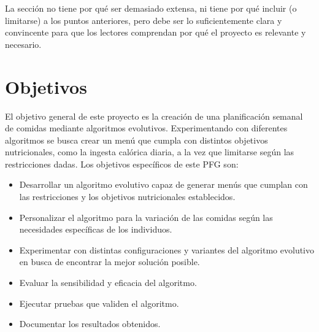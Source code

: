 La sección no tiene por qué ser demasiado extensa, ni tiene por qué incluir (o limitarse) a los puntos anteriores, pero debe ser lo suficientemente clara y convincente para que los lectores comprendan por qué el proyecto es relevante y necesario.


\section{Objetivos}
\label{ch:objetivos}

El objetivo general de este proyecto es la creación de una planificación semanal de comidas mediante algoritmos evolutivos. Experimentando con diferentes algoritmos se busca crear un menú que cumpla con distintos objetivos nutricionales, como la ingesta calórica diaria, a la vez que limitarse según las restricciones dadas. Los objetivos específicos de este PFG son:

\begin{itemize}
    \item Desarrollar un algoritmo evolutivo capaz de generar menús que cumplan con las restricciones y los objetivos nutricionales establecidos.
    \item Personalizar el algoritmo para la variación de las comidas según las necesidades específicas de los individuos.
    \item Experimentar con distintas configuraciones y variantes del algoritmo evolutivo en busca de encontrar la mejor solución posible.
    \item Evaluar la sensibilidad y eficacia del algoritmo.
    \item Ejecutar pruebas que validen el algoritmo.
    \item Documentar los resultados obtenidos.
\end{itemize}

